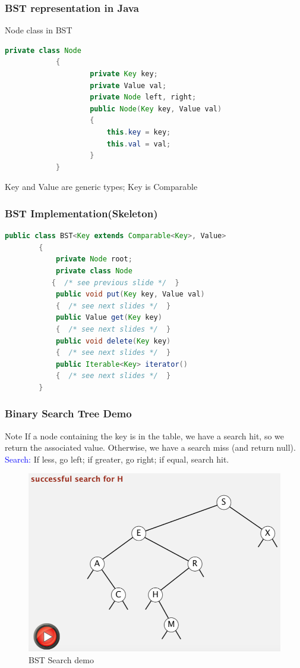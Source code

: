 \documentclass[11pt]{beamer}
\begin{document}
      \begin{frame}[fragile]
     	\frametitle{BST representation in Java}
     	 \begin{block}{Node class in BST}
    	\begin{lstlisting}[language=Java]
     	 private class Node
     	 	{
     	 			private Key key;
     	 			private Value val;
     	 			private Node left, right;
     	 			public Node(Key key, Value val)
     	 			{
     	 				this.key = key;
     	 				this.val = val;
     	 			}
     	 	}
     	\end{lstlisting}
     	 \end{block}
         \alert{Key and Value are generic types; Key is Comparable}
     \end{frame}
 
      \begin{frame}[fragile]
     	\frametitle{BST Implementation(Skeleton)}
      	\begin{lstlisting}[language=Java]
        public class BST<Key extends Comparable<Key>, Value>
        {
        	private Node root;
        	private class Node
           {  /* see previous slide */  }
        	public void put(Key key, Value val)
         	{  /* see next slides */  }
        	public Value get(Key key)
        	{  /* see next slides */  }
        	public void delete(Key key)
        	{  /* see next slides */  }
        	public Iterable<Key> iterator()
        	{  /* see next slides */  }
      	}
   	\end{lstlisting}
     \end{frame}
 
    \begin{frame}[fragile]
    	\frametitle{Binary Search Tree Demo}
    	\begin{block}{Note}
    		 If a node containing the key is in the table, we have a search hit, so we return the associated value. Otherwise, we have a search miss (and return null).\\
    		 	\textcolor{blue}{Search: }If less, go left; if greater, go right; if equal, search hit.
    	\end{block}
        \begin{figure}
        	\centering
        	\includegraphics[width=0.6\linewidth]{"Screenshot 2020-11-02 at 10.56.03 AM"}
        	\caption{BST Search demo}
        	\label{fig:screenshot-2020-11-02-at-10}
        \end{figure}    
    \end{frame}
\end{document}
